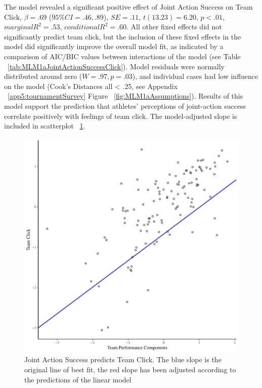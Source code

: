 The model revealed a significant positive effect of Joint Action Success on Team Click, $\beta = .69$ ($95\% CI =  .46, .89$), $SE = .11$, $t(13.23) = 6.20$, $p < .01$, $marginal R^2 = .53$, $conditional R^2 = .60$. All other fixed effects did not significantly predict team click, but the inclusion of these fixed effects in the model did significantly improve the overall model fit, as indicated by a comparison of AIC/BIC values between interactions of the model (see Table ~\ref{tab:MLM1aJointActionSuccessClick}).  Model residuals were normally distributed around zero ($W = .97, p = .03$), and individual cases had low influence on the model (Cook's Distances all < .25, see Appendix ~\ref{app5:tournamentSurvey} Figure ~\ref{fig:MLM1aAssumptions}). Results of this model support the prediction that athletes' perceptions of joint-action success correlate positively with feelings of team click.  The model-adjusted slope is included in scatterplot ~\ref{fig:jasClickModelSLope}.





\begin{figure}[htbp]
  \centering
\includegraphics[scale = .5]{images/jasClickModelSlope}
  \caption{Joint Action Success predicts Team Click. The blue slope is the original line of best fit, the red slope has been adjusted according to the predictions of the linear model}
  \label{fig:jasClickModelSLope}
\end{figure}




